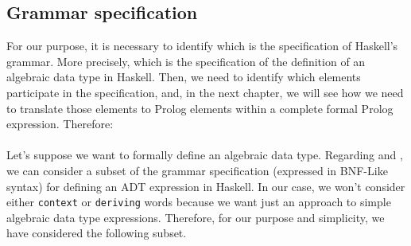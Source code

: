 \subsection{Grammar specification}

For our purpose, it is necessary to identify which is the specification of Haskell's grammar. More precisely, which is the specification of the definition of an algebraic data type in Haskell. Then, we need to identify which elements participate in the specification, and, in the next chapter, we will see how we need to translate those elements to Prolog elements within a complete formal Prolog expression. Therefore: \\\\
Let's suppose we want to formally define an algebraic data type. Regarding \cite{hasksynt} and \cite{haskdat}, we can consider a subset of the grammar specification (expressed in BNF-Like syntax) for defining an ADT expression in Haskell. In our case, we won't consider either \texttt{context} or \texttt{deriving} words because we want just an approach to simple algebraic data type expressions. Therefore, for our purpose and simplicity, we have considered the following subset.\\

